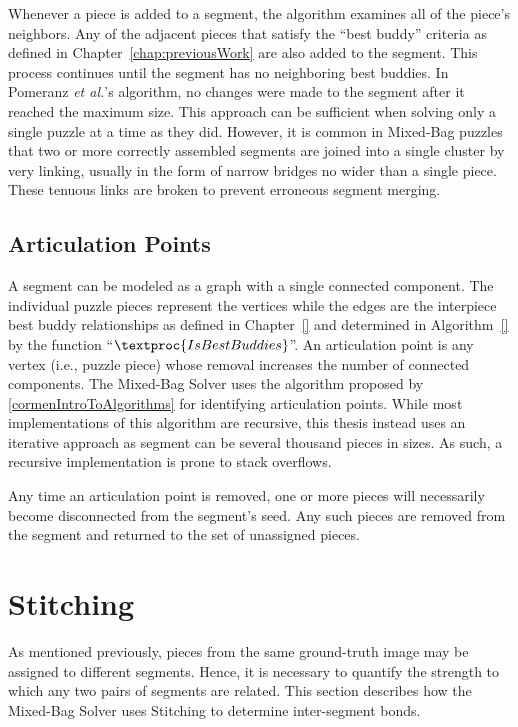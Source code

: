 Whenever a piece is added to a segment, the algorithm examines all of the piece's neighbors.  Any of the adjacent pieces that satisfy the ``best buddy'' criteria as defined in Chapter~\ref{chap:previousWork} are also added to the segment.  This process continues until the segment has no neighboring best buddies. In Pomeranz \textit{et al.}'s algorithm, no changes were made to the segment after it reached the maximum size.  This approach can be sufficient when solving only a single puzzle at a time as they did.  However, it is common in Mixed-Bag puzzles that two or more correctly assembled segments are joined into a single cluster by very linking, usually in the form of narrow bridges no wider than a single piece.  These tenuous links are broken to prevent erroneous segment merging.  

\subsection{Articulation Points}\label{sec:ArticulationPoints}

A segment can be modeled as a graph with a single connected component.  The individual puzzle pieces represent the vertices while the edges are the interpiece best buddy relationships as defined in Chapter~\ref{} and determined in Algorithm~\ref{} by the function ``$\textproc{IsBestBuddies}$''.  An articulation point is any vertex (i.e., puzzle piece) whose removal increases the number of connected components.  The Mixed-Bag Solver uses the algorithm proposed by \ref{cormenIntroToAlgorithms} for identifying articulation points.  While most implementations of this algorithm are recursive, this thesis instead uses an iterative approach as segment can be several thousand pieces in sizes.  As such, a recursive implementation is prone to stack overflows.

Any time an articulation point is removed, one or more pieces will necessarily become disconnected from the segment's seed.  Any such pieces are removed from the segment and returned to the set of unassigned pieces.  

\section{Stitching}\label{sec:stitching}

As mentioned previously, pieces from the same ground-truth image may be assigned to different segments.  Hence, it is necessary to quantify the strength to which any two pairs of segments are related.  This section describes how the Mixed-Bag Solver uses Stitching to determine inter-segment bonds.

